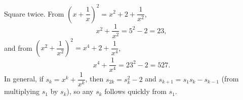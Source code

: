 Square twice. From $\left(x+\dfrac{1}{x}\right)^2=x^2+2+\dfrac{1}{x^2}$,
\[
x^2+\dfrac{1}{x^2}=5^2-2=23 ,
\]
and from $\left(x^2+\dfrac{1}{x^2}\right)^2=x^4+2+\dfrac{1}{x^4}$,
\[
x^4+\dfrac{1}{x^4}=23^2-2=\boxed{527}.
\]
In general, if $s_k=x^k+\dfrac{1}{x^k}$, then $s_{2k}=s_k^2-2$ and $s_{k+1}=s_1s_k-s_{k-1}$ (from multiplying $s_1$ by $s_k$), so any $s_k$ follows quickly from $s_1$.
